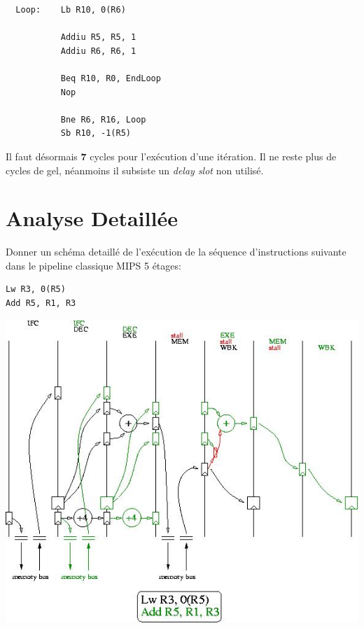 \begin{correction}

  \begin{verbatim}
  Loop:    Lb R10, 0(R6)

           Addiu R5, R5, 1
           Addiu R6, R6, 1

           Beq R10, R0, EndLoop
           Nop

           Bne R6, R16, Loop
           Sb R10, -1(R5)
  \end{verbatim}

  Il faut d\'esormais \textbf{7} cycles pour l'ex\'ecution d'une it\'eration.
  Il ne reste plus de cycles de gel, n\'eanmoins il subsiste un
  \textit{delay slot} non utilis\'e.

\end{correction}

%
%

\section{Analyse Detaill\'ee}

Donner un sch\'ema detaill\'e de l'ex\'ecution de la s\'equence d'instructions
suivante dans le pipeline classique MIPS 5 \'etages:

\begin{verbatim}
Lw R3, 0(R5)
Add R5, R1, R3
\end{verbatim}

\begin{correction}

  \begin{center}
    \includegraphics[scale=0.7]{figures/correction-analyse-detaillee.jpg}
  \end{center}

\end{correction}

